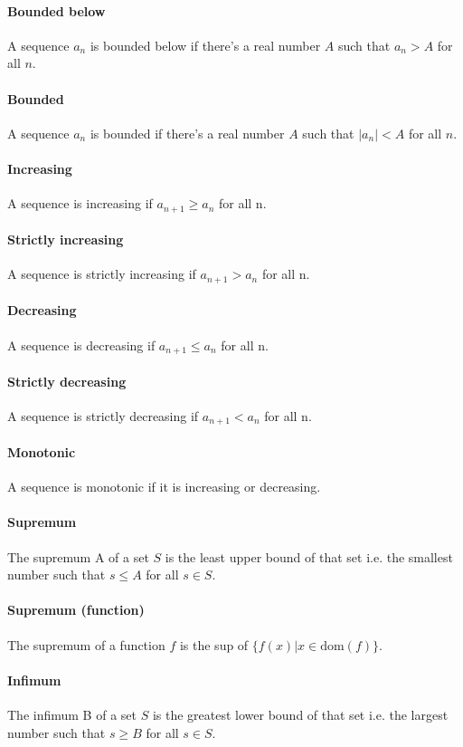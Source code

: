 \documentclass{article}
\begin{document}
\paragraph{Bounded below}
A sequence $ a_{n} $ is bounded below if there's a real number $ A $ such that $ a_{n} > A $ for all $ n $.
\paragraph{Bounded}
A sequence $ a_{n} $ is bounded if there's a real number $ A $ such that $ |a_{n}| < A $ for all $ n $.
\paragraph{Increasing}
A sequence is increasing if $ a_{n + 1} \geq a_{n} $ for all n.
\paragraph{Strictly increasing}
A sequence is strictly increasing if $ a_{n + 1} > a_{n} $ for all n.
\paragraph{Decreasing}
A sequence is decreasing if $ a_{n + 1} \leq a_{n} $ for all n.
\paragraph{Strictly decreasing}
A sequence is strictly decreasing if $ a_{n + 1} < a_{n} $ for all n.
\paragraph{Monotonic}
A sequence is monotonic if it is increasing or decreasing.
\paragraph{Supremum}
The supremum A of a set $ S $ is the least upper bound of that set i.e. the smallest number such that $ s \leq A $ for all $ s \in S $.
\paragraph{Supremum (function)}
The supremum of a function $ f $ is the sup of $ \{f(x) | x \in \textrm{dom}(f)\} $.
\paragraph{Infimum}
The infimum B of a set $ S $ is the greatest lower bound of that set i.e. the largest number such that $ s \geq B $ for all $ s \in S $.
\end{document}
